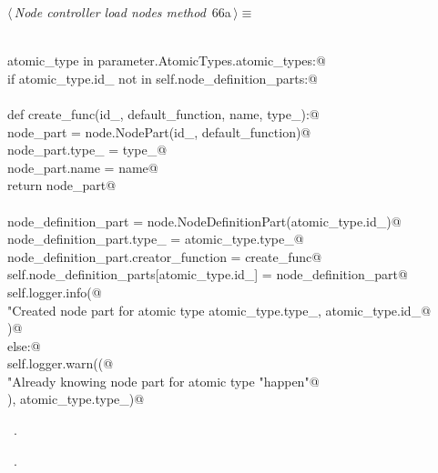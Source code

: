 \documentclass[
    a4paper,      %
    10pt,         %
    openright,    %
    notitlepage,  %
    parskip=half, %
]{scrreprt}       %
\theoremstyle{definition}                    %
\begin{document}
\begin{flushleft} \small
\begin{minipage}{\linewidth}\label{scrap110}\raggedright\small
{} $\langle\,${\itshape Node controller load nodes method}\nobreak\ {\footnotesize {66a}}$\,\rangle\equiv$
\vspace{-1exm}
\begin{list}{}{} \item
\mbox{}\lstinline@@\\
\mbox{}\lstinline@for atomic_type in parameter.AtomicTypes.atomic_types:@\\
\mbox{}\lstinline@    if atomic_type.id_ not in self.node_definition_parts:@\\
\mbox{}\lstinline@@\\
\mbox{}\lstinline@        def create_func(id_, default_function, name, type_):@\\
\mbox{}\lstinline@            node_part = node.NodePart(id_, default_function)@\\
\mbox{}\lstinline@            node_part.type_ = type_@\\
\mbox{}\lstinline@            node_part.name = name@\\
\mbox{}\lstinline@            return node_part@\\
\mbox{}\lstinline@@\\
\mbox{}\lstinline@        node_definition_part = node.NodeDefinitionPart(atomic_type.id_)@\\
\mbox{}\lstinline@        node_definition_part.type_ = atomic_type.type_@\\
\mbox{}\lstinline@        node_definition_part.creator_function = create_func@\\
\mbox{}\lstinline@        self.node_definition_parts[atomic_type.id_] = node_definition_part@\\
\mbox{}\lstinline@        self.logger.info(@\\
\mbox{}\lstinline@            "Created node part for atomic type %s: %s",@\\
\mbox{}\lstinline@            atomic_type.type_, atomic_type.id_@\\
\mbox{}\lstinline@        )@\\
\mbox{}\lstinline@    else:@\\
\mbox{}\lstinline@        self.logger.warn((@\\
\mbox{}\lstinline@            "Already knowing node part for atomic type %s. This should not"@\\
\mbox{}\lstinline@            "happen"@\\
\mbox{}\lstinline@        ), atomic_type.type_)@{\NWsep}
\end{list}
\vspace{-1.5ex}
\footnotesize
\begin{list}{}{\setlength{\itemsep}{-\parsep}\setlength{\itemindent}{-\leftmargin}}
\item \NWtxtMacroDefBy\ .
\item \NWtxtMacroRefIn\ .


\end{list}
\end{minipage}
\end{flushleft}
\end{document}

